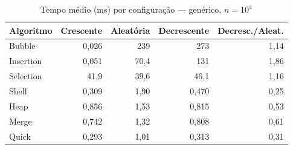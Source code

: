 \begin{table}[htbp]\centering\small
\caption{Tempo médio (ms) por configuração — genérico, $n = 10^4$}\label{tab:cfg-gen-10k}
\begin{tabular}{lrrrr}
\toprule
Algoritmo & Crescente & Aleatória & Decrescente & Decresc./Aleat. \\
\midrule
Bubble & 0,026 & 239 & 273 & 1,14 \\
Insertion & 0,051 & 70,4 & 131 & 1,86 \\
Selection & 41,9 & 39,6 & 46,1 & 1,16 \\
Shell & 0,309 & 1,90 & 0,470 & 0,25 \\
Heap & 0,856 & 1,53 & 0,815 & 0,53 \\
Merge & 0,742 & 1,32 & 0,808 & 0,61 \\
Quick & 0,293 & 1,01 & 0,313 & 0,31 \\
\bottomrule
\end{tabular}
\end{table}